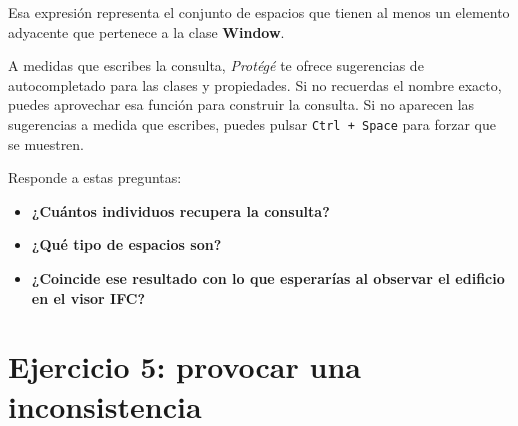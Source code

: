 \documentclass[
  spanish,
  11pt,
  a4paper,
  DIV=11,
  numbers=noendperiod]{scrartcl}
\providecommand{\tightlist}{\setlength{\itemsep}{0pt}\setlength{\parskip}{0pt}}
\begin{document}
Esa expresión representa el conjunto de espacios que tienen al menos un
elemento adyacente que pertenece a la clase \textbf{Window}.

\begin{tcolorbox}[enhanced jigsaw, leftrule=.75mm, breakable, colback=white, colbacktitle=quarto-callout-note-color!10!white, bottomrule=.15mm, left=2mm, bottomtitle=1mm, coltitle=black, toprule=.15mm, toptitle=1mm, rightrule=.15mm, opacityback=0, title=\textcolor{quarto-callout-note-color}{\faInfo}\hspace{0.5em}{Pista}, arc=.35mm, titlerule=0mm, colframe=quarto-callout-note-color-frame, opacitybacktitle=0.6]

A medidas que escribes la consulta, \emph{Protégé} te ofrece sugerencias
de autocompletado para las clases y propiedades. Si no recuerdas el
nombre exacto, puedes aprovechar esa función para construir la consulta.
Si no aparecen las sugerencias a medida que escribes, puedes pulsar
\texttt{Ctrl\ +\ Space} para forzar que se muestren.

\end{tcolorbox}


\begin{tcolorbox}[enhanced jigsaw, leftrule=.75mm, breakable, colback=white, colbacktitle=quarto-callout-note-color!10!white, bottomrule=.15mm, left=2mm, bottomtitle=1mm, coltitle=black, toprule=.15mm, toptitle=1mm, rightrule=.15mm, opacityback=0, title=\textcolor{quarto-callout-note-color}{\faInfo}\hspace{0.5em}{Explora los resultados}, arc=.35mm, titlerule=0mm, colframe=quarto-callout-note-color-frame, opacitybacktitle=0.6]

Responde a estas preguntas:

\begin{itemize}
\tightlist
\item
  \textbf{¿Cuántos individuos recupera la consulta?}
\item
  \textbf{¿Qué tipo de espacios son?}
\item
  \textbf{¿Coincide ese resultado con lo que esperarías al observar el
  edificio en el visor IFC?}
\end{itemize}

\end{tcolorbox}

\section{Ejercicio 5: provocar una
inconsistencia}\label{ejercicio-5-provocar-una-inconsistencia}
\end{document}
